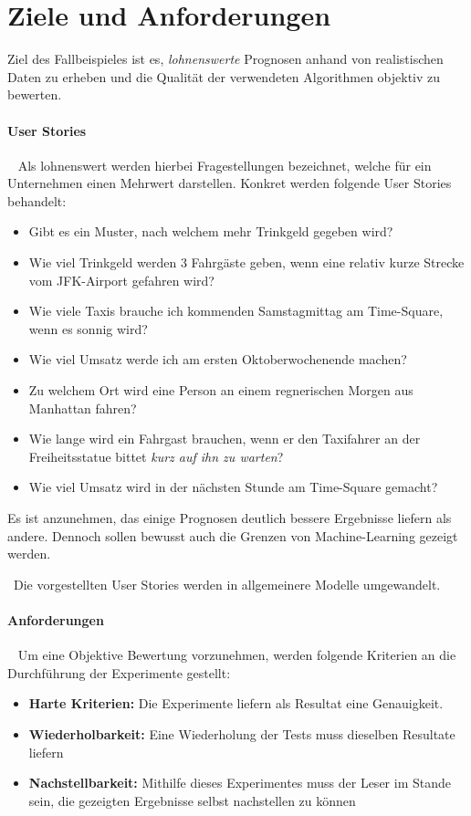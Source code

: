 \section{Ziele und Anforderungen}
\label{sec:Fallbeispiel} \label{sec:TaxiAllgemein} \label{sec:Allgemein}
Ziel des Fallbeispieles ist es, \textit{lohnenswerte} Prognosen anhand von realistischen Daten zu erheben und die Qualität der verwendeten Algorithmen objektiv zu bewerten. 

\paragraph{User Stories} ~\newline
Als lohnenswert werden hierbei Fragestellungen bezeichnet, welche für ein Unternehmen einen Mehrwert darstellen. Konkret werden folgende User Stories behandelt: ~\newline

\begin{itemize}
	\item Gibt es ein Muster, nach welchem mehr Trinkgeld gegeben wird?
	\item Wie viel Trinkgeld werden 3 Fahrgäste geben, wenn eine relativ kurze Strecke vom JFK-Airport gefahren wird?
	\item Wie viele Taxis brauche ich kommenden Samstagmittag am Time-Square, wenn es sonnig wird?
	\item Wie viel Umsatz werde ich am ersten Oktoberwochenende machen?
	\item Zu welchem Ort wird eine Person an einem regnerischen Morgen aus Manhattan fahren?
	\item Wie lange wird ein Fahrgast brauchen, wenn er den Taxifahrer an der Freiheitsstatue bittet \textit{kurz auf ihn zu warten}?
	\item Wie viel Umsatz wird in der nächsten Stunde am Time-Square gemacht?
\end{itemize}

Es ist anzunehmen, das einige Prognosen deutlich bessere Ergebnisse liefern als andere. Dennoch sollen bewusst auch die Grenzen von Machine-Learning gezeigt werden.

~\newline Die vorgestellten User Stories werden in allgemeinere Modelle umgewandelt.

\paragraph{Anforderungen} ~\newline
Um eine Objektive Bewertung vorzunehmen, werden folgende Kriterien an die Durchführung der Experimente gestellt: 

\begin{itemize}
	\item \textbf{Harte Kriterien:} Die Experimente liefern als Resultat eine Genauigkeit. 
	\item \textbf{Wiederholbarkeit:} Eine Wiederholung der Tests muss dieselben Resultate liefern
	\item \textbf{Nachstellbarkeit:} Mithilfe dieses Experimentes muss der Leser im Stande sein, die gezeigten Ergebnisse selbst nachstellen zu können
\end{itemize}